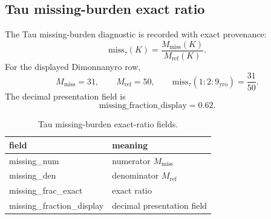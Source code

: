 \subsection{Tau missing-burden exact ratio}\label{manual:dec-ledger:tau-ratio}
The Tau missing-burden diagnostic is recorded with exact provenance:
\[
\mathrm{miss}_\tau(K)=\frac{M_{\mathrm{miss}}(K)}{M_{\mathrm{ref}}(K)}.
\]
For the displayed Dimonnanyro row,
\[
M_{\mathrm{miss}}=31,
\qquad
M_{\mathrm{ref}}=50,
\qquad
\mathrm{miss}_\tau(1{:}2{:}9_{\mathrm{yro}})=\frac{31}{50}.
\]
The decimal presentation field is
\[
\mathrm{missing\_fraction\_display}=0.62.
\]
\begin{table}[H]
\centering
\scriptsize
\caption{Tau missing-burden exact-ratio fields.}
\begin{tabular}{l l}
\toprule
field & meaning\\
\midrule
missing\_num & numerator $M_{\mathrm{miss}}$\\
missing\_den & denominator $M_{\mathrm{ref}}$\\
missing\_frac\_exact & exact ratio\\
missing\_fraction\_display & decimal presentation field\\
\bottomrule
\end{tabular}
\label{tab:manual-dec-tau-missing-ratio-fields}
\end{table}

\fi
